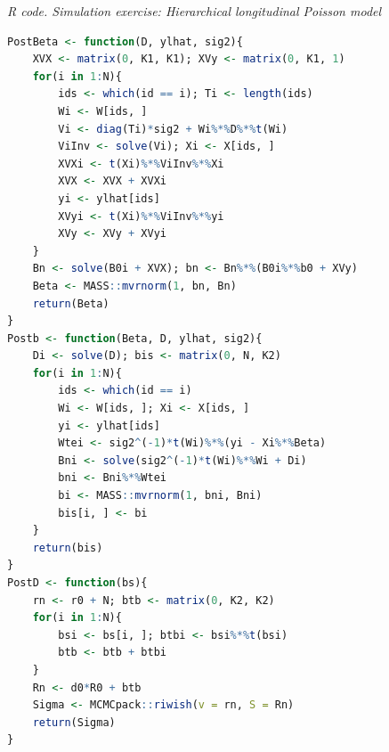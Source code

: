 \begin{tcolorbox}[enhanced,width=4.67in,center upper,
	fontupper=\large\bfseries,drop shadow southwest,sharp corners]
	\textit{R code. Simulation exercise: Hierarchical longitudinal Poisson model}
	\begin{VF}
		\begin{lstlisting}[language=R]
PostBeta <- function(D, ylhat, sig2){
	XVX <- matrix(0, K1, K1); XVy <- matrix(0, K1, 1)
	for(i in 1:N){
		ids <- which(id == i); Ti <- length(ids)
		Wi <- W[ids, ]
		Vi <- diag(Ti)*sig2 + Wi%*%D%*%t(Wi)
		ViInv <- solve(Vi); Xi <- X[ids, ]
		XVXi <- t(Xi)%*%ViInv%*%Xi
		XVX <- XVX + XVXi
		yi <- ylhat[ids]
		XVyi <- t(Xi)%*%ViInv%*%yi
		XVy <- XVy + XVyi
	}
	Bn <- solve(B0i + XVX); bn <- Bn%*%(B0i%*%b0 + XVy)
	Beta <- MASS::mvrnorm(1, bn, Bn)
	return(Beta)
}
Postb <- function(Beta, D, ylhat, sig2){
	Di <- solve(D); bis <- matrix(0, N, K2)
	for(i in 1:N){
		ids <- which(id == i)
		Wi <- W[ids, ]; Xi <- X[ids, ]
		yi <- ylhat[ids]
		Wtei <- sig2^(-1)*t(Wi)%*%(yi - Xi%*%Beta)
		Bni <- solve(sig2^(-1)*t(Wi)%*%Wi + Di)
		bni <- Bni%*%Wtei
		bi <- MASS::mvrnorm(1, bni, Bni)
		bis[i, ] <- bi
	}
	return(bis)
}
PostD <- function(bs){
	rn <- r0 + N; btb <- matrix(0, K2, K2)
	for(i in 1:N){
		bsi <- bs[i, ]; btbi <- bsi%*%t(bsi)
		btb <- btb + btbi
	}
	Rn <- d0*R0 + btb
	Sigma <- MCMCpack::riwish(v = rn, S = Rn)
	return(Sigma)
}
\end{lstlisting}
	\end{VF}
\end{tcolorbox}


